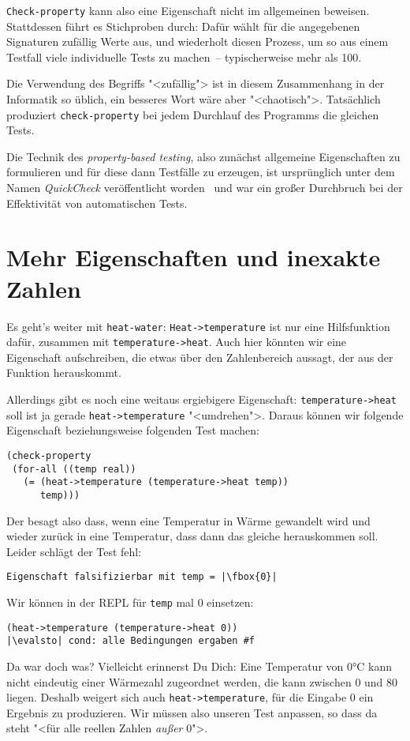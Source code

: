 \lstinline{Check-property} kann also eine Eigenschaft nicht im
allgemeinen beweisen.  Stattdessen führt es Stichproben durch: Dafür
wählt für die angegebenen Signaturen zufällig Werte aus, und
wiederholt diesen Prozess, um so aus einem Testfall viele individuelle
Tests zu machen~-- typischerweise mehr als 100.

Die Verwendung des Begriffs "<zufällig"> ist in diesem Zusammenhang in
der Informatik so üblich, ein besseres Wort wäre aber "<chaotisch">.
Tatsächlich produziert \lstinline{check-property} bei jedem Durchlauf
des Programms die gleichen Tests.

Die Technik des \textit{property-based testing}, also zunächst
allgemeine Eigenschaften zu formulieren und für diese dann Testfälle
zu erzeugen, ist ursprünglich unter dem Namen \textit{QuickCheck}
veröffentlicht worden~\cite{ClaessenHughes2000} und war ein
großer Durchbruch bei der Effektivität von automatischen Tests.

\section{Mehr Eigenschaften und inexakte Zahlen}

Es geht's weiter mit \lstinline{heat-water}:
\lstinline{Heat->temperature} ist nur eine Hilfsfunktion dafür,
zusammen mit \lstinline{temperature->heat}.  Auch hier könnten wir
eine Eigenschaft aufschreiben, die etwas über den Zahlenbereich
aussagt, der aus der Funktion herauskommt.

Allerdings gibt es noch eine weitaus ergiebigere Eigenschaft:
\lstinline{temperature->heat} soll ist ja gerade
\lstinline{heat->temperature} "<umdrehen">.  Daraus können wir
folgende Eigenschaft beziehungsweise folgenden Test machen:
%
\begin{lstlisting}
(check-property
 (for-all ((temp real))
   (= (heat->temperature (temperature->heat temp))
      temp)))
\end{lstlisting}
%
Der besagt also dass, wenn eine Temperatur in Wärme gewandelt wird und
wieder zurück in eine Temperatur, dass dann das gleiche herauskommen
soll.  Leider schlägt der Test fehl:
%
\begin{lstlisting}
Eigenschaft falsifizierbar mit temp = |\fbox{0}|
\end{lstlisting}
%
Wir können in der REPL für \lstinline{temp} mal 0 einsetzen:
%
\begin{lstlisting}
(heat->temperature (temperature->heat 0))
|\evalsto| cond: alle Bedingungen ergaben #f
\end{lstlisting}
%
Da war doch was?  Vielleicht erinnerst Du Dich: Eine Temperatur von
0\si{\degree}C kann nicht eindeutig einer Wärmezahl zugeordnet werden,
die kann zwischen 0 und 80 liegen.  Deshalb weigert sich auch
\lstinline{heat->temperature}, für die Eingabe 0 ein Ergebnis zu
produzieren.  Wir müssen also unseren Test anpassen, so dass da steht
"<für alle reellen Zahlen \emph{außer} 0">.


